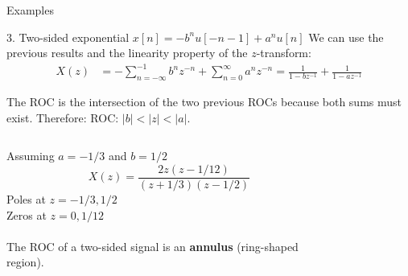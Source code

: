 \documentclass[10pt]{beamer}
\begin{document}
\begin{frame}{Examples}

\begin{block}{3. Two-sided exponential $x[n] = -b^nu[-n-1] + a^nu[n]$}
	We can use the previous results and the linearity property of the $z$-transform:
	\vspace{-0.25cm}
	\begin{align*} 
	X(z) &= -\sum_{n=-\infty}^{-1} b^nz^{-n} + \sum_{n=0}^\infty a^nz^{-n} = \frac{1}{1-bz^{-1}} + \frac{1}{1-az^{-1}} 
	\end{align*}
	
	The ROC is the intersection of the two previous ROCs because both sums must exist. Therefore:
	ROC: $|b| < |z| < |a|$.

	\begin{columns}
		\begin{column}{0.5\textwidth}
			Assuming $a = -1/3$ and $b=1/2$
			\begin{equation*} 
			X(z) = \frac{2z(z-1/12)}{(z+1/3)(z-1/2)}
			\end{equation*}
			Poles at $z = -1/3, 1/2$\\
			Zeros at $z = 0, 1/12$
			~\\
			~\\
			The ROC of a two-sided signal is an \textbf{annulus} (ring-shaped region).
			
		\end{column}
		\begin{column}{0.5\textwidth}  %
			\begin{figure}
				\centering
				\resizebox{0.95\linewidth}{!}{}
				\label{fig:left_sided_exp}
			\end{figure}
		\end{column}
	\end{columns}
	
\end{block}
\end{frame}
\end{document}
